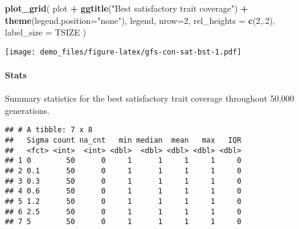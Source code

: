 \documentclass[]{book}
\newenvironment{Shaded}{\begin{snugshade}}{\end{snugshade}}
\newcommand{\DataTypeTok}[1]{\textcolor[rgb]{0.13,0.29,0.53}{#1}}
\newcommand{\DecValTok}[1]{\textcolor[rgb]{0.00,0.00,0.81}{#1}}
\newcommand{\KeywordTok}[1]{\textcolor[rgb]{0.13,0.29,0.53}{\textbf{#1}}}
\newcommand{\NormalTok}[1]{#1}
\newcommand{\OperatorTok}[1]{\textcolor[rgb]{0.81,0.36,0.00}{\textbf{#1}}}
\newcommand{\OtherTok}[1]{\textcolor[rgb]{0.56,0.35,0.01}{#1}}
\newcommand{\StringTok}[1]{\textcolor[rgb]{0.31,0.60,0.02}{#1}}
\let\oldparagraph\paragraph
\renewcommand{\paragraph}[1]{\oldparagraph{#1}\mbox{}}
\begin{document}
\begin{Shaded}
\begin{Highlighting}[]
\KeywordTok{plot_grid}\NormalTok{(}
\NormalTok{  plot }\OperatorTok{+}
\StringTok{    }\KeywordTok{ggtitle}\NormalTok{(}\StringTok{"Best satisfactory trait coverage"}\NormalTok{) }\OperatorTok{+}
\StringTok{    }\KeywordTok{theme}\NormalTok{(}\DataTypeTok{legend.position=}\StringTok{"none"}\NormalTok{),}
\NormalTok{  legend,}
  \DataTypeTok{nrow=}\DecValTok{2}\NormalTok{,}
  \DataTypeTok{rel_heights =} \KeywordTok{c}\NormalTok{(}\DecValTok{2}\NormalTok{,.}\DecValTok{2}\NormalTok{),}
  \DataTypeTok{label_size =}\NormalTok{ TSIZE}
\NormalTok{)}
\end{Highlighting}
\end{Shaded}

\texttt{[image: demo\_files/figure-latex/gfs-con-sat-bst-1.pdf]}

\hypertarget{stats-43}{%
\paragraph{Stats}\label{stats-43}}

Summary statistics for the best satisfactory trait coverage throughout 50,000 generations.

\begin{Shaded}
\end{Shaded}

\begin{verbatim}
## # A tibble: 7 x 8
##   Sigma count na_cnt   min median  mean   max   IQR
##   <fct> <int>  <int> <dbl>  <dbl> <dbl> <dbl> <dbl>
## 1 0        50      0     1      1     1     1     0
## 2 0.1      50      0     1      1     1     1     0
## 3 0.3      50      0     1      1     1     1     0
## 4 0.6      50      0     1      1     1     1     0
## 5 1.2      50      0     1      1     1     1     0
## 6 2.5      50      0     1      1     1     1     0
## 7 5        50      0     1      1     1     1     0
\end{verbatim}
\end{document}
